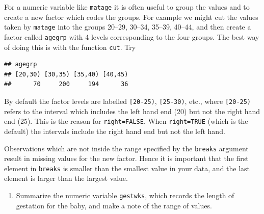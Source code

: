 \documentclass[
]{book}
\newenvironment{Shaded}{\begin{snugshade}}{\end{snugshade}}
\newcommand{\AttributeTok}[1]{\textcolor[rgb]{0.13,0.29,0.53}{#1}}
\newcommand{\ConstantTok}[1]{\textcolor[rgb]{0.56,0.35,0.01}{#1}}
\newcommand{\DecValTok}[1]{\textcolor[rgb]{0.00,0.00,0.81}{#1}}
\newcommand{\FunctionTok}[1]{\textcolor[rgb]{0.13,0.29,0.53}{\textbf{#1}}}
\newcommand{\NormalTok}[1]{#1}
\newcommand{\OtherTok}[1]{\textcolor[rgb]{0.56,0.35,0.01}{#1}}
\newcommand{\SpecialCharTok}[1]{\textcolor[rgb]{0.81,0.36,0.00}{\textbf{#1}}}
\providecommand{\tightlist}{%
  \setlength{\itemsep}{0pt}\setlength{\parskip}{0pt}}
\begin{document}
For a numeric variable like \texttt{matage} it is often useful
to group the values and to create a new factor which codes the groups.
For example we might cut the values taken by \texttt{matage} into the
groups 20--29, 30--34, 35--39, 40--44, and then create a factor called
\texttt{agegrp} with 4 levels corresponding to the four groups. The best way of doing this is
with the function \texttt{cut}. Try

\begin{Shaded}
\end{Shaded}

\begin{verbatim}
## agegrp
## [20,30) [30,35) [35,40) [40,45) 
##      70     200     194      36
\end{verbatim}

By default the factor levels are labelled \texttt{{[}20-25)},
\texttt{{[}25-30)}, etc., where \texttt{{[}20-25)} refers to the interval
which includes the left hand end (20) but not the right hand end
(25). This is the reason for \texttt{right=FALSE}. When \texttt{right=TRUE}
(which is the default) the intervals include the right hand end but
not the left hand.

Observations which are not inside the range specified by the \texttt{breaks}
argument result in missing values for the new factor. Hence it
is important that the first element in \texttt{breaks} is smaller than the
smallest value in your data, and the last element is larger than the
largest value.

\begin{enumerate}
\def\labelenumi{\arabic{enumi}.}
\tightlist
\item
  Summarize the numeric variable \texttt{gestwks}, which records the
  length of gestation for the baby, and make a note of the range of
  values.
\end{enumerate}
\end{document}
